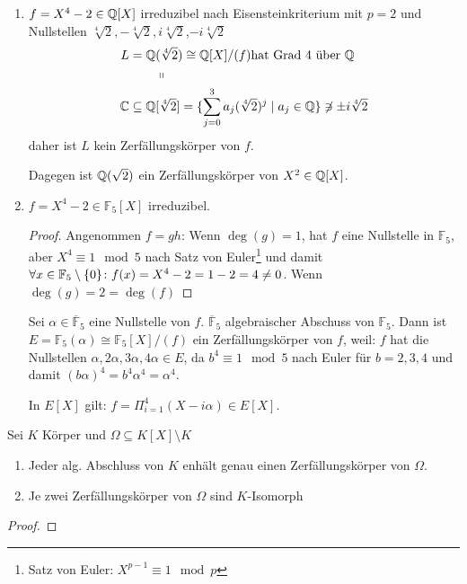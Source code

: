 \documentclass[../main.tex]{subfiles}
\begin{document}
\begin{example}
    \begin{enumerate}[label=\alph*)]
        \item $f=X^4 -2 \in \mathbb{Q}[X]$ irreduzibel nach Eisensteinkriterium mit $p=2$ und Nullstellen $\sqrt[4]{2},-\sqrt[4]{2},i\sqrt[4]{2}$,$-i\sqrt[4]{2}$
        \begin{align*}
            L=\mathbb{Q}&(\sqrt[4]{2}) \cong \mathbb{Q}[X]/(f) \text{hat Grad 4 über }\mathbb{Q}\\
            &\shortparallel\\
            \mathbb{C}\subseteq\mathbb{Q}&[\sqrt[4]{2}] = \{\sum_{j=0}^{3} a_j (\sqrt[4]{2})^j\mid a_j \in \mathbb{Q}\} \not\owns \pm i \sqrt[4]{2}
        \end{align*}
        daher ist $L$ kein Zerfällungskörper von $f$.

        Dagegen ist $\mathbb{Q}(\sqrt{2})$ ein Zerfällungskörper von $X^2 \in \mathbb{Q}[X]$.
        \item $f=X^4-2 \in \mathbb{F}_5[X]$ irreduzibel.
        \begin{proof}
            Angenommen $f=gh$: 
            Wenn $\deg(g)=1$, hat $f$ eine Nullstelle in $\mathbb{F}_5$, aber $X^4 \equiv 1 \mod{5}$ nach Satz von Euler\footnote{Satz von Euler: $X^{p-1} \equiv 1 \mod{p}$} und damit $\forall x\in \mathbb{F}_5\setminus\{0\}\colon f(x)=X^4-2=1-2=4\neq0$.
            Wenn $\deg(g)= 2 = \deg(f)$ 
        \end{proof}
        Sei $\alpha\in \overline{\mathbb{F}}_5$ eine Nullstelle von $f$. $\overline{\mathbb{F}}_5$ algebraischer Abschuss von $\mathbb{F}_5$.
        Dann ist $E = \mathbb{F}_5(\alpha) \cong \mathbb{F}_5[X]/(f)$ ein Zerfällungskörper von $f$, weil:
        $f$ hat die Nullstellen $\alpha, 2\alpha, 3\alpha, 4\alpha \in E$, da $b^4\equiv 1 \mod{5}$ nach Euler für $b=2,3,4$ und damit $(b\alpha)^4 = b^4\alpha^4=\alpha^4$.

        In $E[X]$ gilt: $f = \Pi_{i=1}^4 ( X-i\alpha) \in E[X]$.
    \end{enumerate}
\end{example}

\begin{theorem} \label{theo:2.35}
    Sei $K$ Körper und $\Omega\subseteq K[X]\setminus K$
    \begin{enumerate}[label=\alph*)]
        \item Jeder alg. Abschluss von $K$ enhält genau einen Zerfällungskörper von $\Omega$.
        \item Je zwei Zerfällungskörper von $\Omega$ sind $K$-Isomorph
    \end{enumerate}
\end{theorem}
\begin{proof}
    \TODO
\end{proof}
\end{document}
